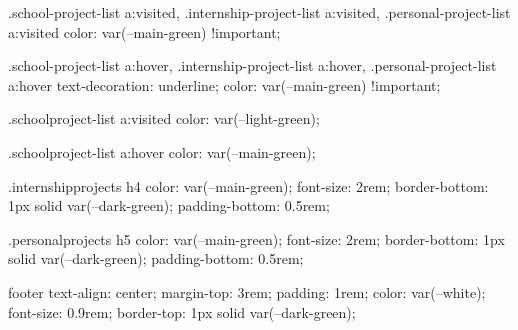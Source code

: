         .school-project-list a:visited,
        .internship-project-list a:visited,
        .personal-project-list a:visited {
            color: var(--main-green) !important;
        }

        .school-project-list a:hover,
        .internship-project-list a:hover,
        .personal-project-list a:hover {
            text-decoration: underline;
            color: var(--main-green) !important;
        }

       
        .schoolproject-list a:visited {
            color: var(--light-green);
        }

        .schoolproject-list a:hover {
            color: var(--main-green);
        }
    

        .internshipprojects h4 {
            color: var(--main-green);
            font-size: 2rem;
            border-bottom: 1px solid var(--dark-green);
            padding-bottom: 0.5rem;
        }

        .personalprojects h5 {
            color: var(--main-green);
            font-size: 2rem;
            border-bottom: 1px solid var(--dark-green);
            padding-bottom: 0.5rem;
        }

        footer {
            text-align: center;
            margin-top: 3rem;
            padding: 1rem;
            color: var(--white);
            font-size: 0.9rem;
            border-top: 1px solid var(--dark-green);
        }
